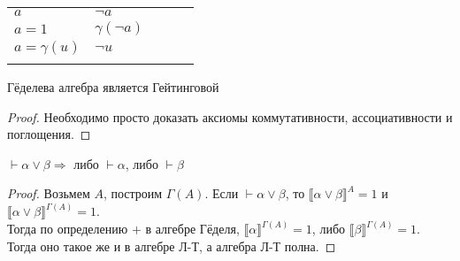 \begin{tabular}{lllll}
\cline{1-2}
\multicolumn{1}{|l|}{$a$} & \multicolumn{1}{l|}{$\neg a$} &  &  &  \\ \cline{1-2}
\multicolumn{1}{|l|}{$a=1$} & \multicolumn{1}{l|}{$\gamma(\neg a)$} &  &  &  \\ \cline{1-2}
\multicolumn{1}{|l|}{$a=\gamma(u)$} & \multicolumn{1}{l|}{$\neg u$} &  &  &  \\ \cline{1-2}
 &  &  &  & 
\end{tabular}
\begin{lemma}
Гёделева алгебра является Гейтинговой
\end{lemma}
\begin{proof}
Необходимо просто доказать аксиомы коммутативности, ассоциативности и поглощения.
\end{proof}

\begin{theorem}
$\vdash \alpha \vee \beta \Rightarrow$ либо $\vdash \alpha$, либо $\vdash \beta$
\end{theorem}
\begin{proof}
Возьмем $A$, построим $\Gamma(A)$. Если $\vdash \alpha \vee \beta$, то $\llbracket \alpha \vee \beta \rrbracket ^ {A} = 1$ и $\llbracket \alpha \vee \beta \rrbracket ^ {\Gamma(A)} = 1$.\\
Тогда по определению $+$ в алгебре Гёделя, $\llbracket \alpha \rrbracket ^ {\Gamma(A)} = 1$, либо $\llbracket \beta \rrbracket ^ {\Gamma(A)} = 1$. Тогда оно такое же и в алгебре Л-Т, а алгебра Л-Т полна.
\end{proof}
